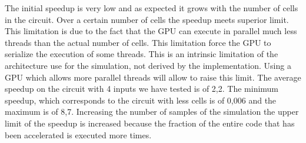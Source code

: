 The initial speedup is very low and as expected it grows with the number of cells in the circuit. Over a certain number of cells the speedup meets superior limit. This limitation is due to the fact that the GPU can execute in parallel much less threads than the actual number of cells. This limitation force the GPU to serialize the execution of some threads. This is an intrinsic limitation of the architecture use for the simulation, not derived by the implementation. Using a GPU which allows more parallel threads will allow to raise this limit. The average speedup on the circuit with 4 inputs we have tested is of 2,2. The minimum speedup, which corresponds to the circuit with less cells is of 0,006 and the maximum is of 8,7. Increasing the number of samples of the simulation the upper limit of the speedup is increased because the fraction of the entire code that has been accelerated is executed more times. 